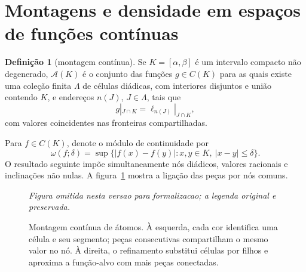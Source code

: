 \documentclass[11pt,a4paper]{article}
\theoremstyle{preciso}
\theoremstyle{definition}
\newtheorem{definicao}[teorema]{Definição}
\newcommand{\Asm}{\mathcal A}
\newcommand{\eqn}[2]{\begin{equation}\label{eq:#1}#2\end{equation}}
\newcommand{\figura}[4]{\begin{figure}[!htbp]\centering
 \emph{Figura omitida nesta versao para formalizacao; a legenda original e preservada.}
 \caption{#3}\label{fig:#4}\end{figure}}
\begin{document}


\section{Montagens e densidade em espaços de funções contínuas}
\begin{definicao}[montagem contínua]
Se $K=[\alpha,\beta]$ é um intervalo compacto não degenerado, $\Asm(K)$ é o conjunto das funções $g\in C(K)$ para as quais existe uma coleção finita $\Lambda$ de células diádicas, com interiores disjuntos e união contendo $K$, e endereços $n(J)$, $J\in\Lambda$, tais que
\eqn{20}{g|_{J\cap K}=\ell_{n(J)}|_{J\cap K},}
com valores coincidentes nas fronteiras compartilhadas.
\end{definicao}
Para $f\in C(K)$, denote o módulo de continuidade por
\eqn{21}{\omega(f;\delta)=\sup\{|f(x)-f(y)|:x,y\in K,\ |x-y|\le\delta\}.}
O resultado seguinte impõe simultaneamente nós diádicos, valores racionais e inclinações não nulas. A figura~\ref{fig:montagem} mostra a ligação das peças por nós comuns.
\figura{03_montagem_continua}{1}{Montagem contínua de átomos. À esquerda, cada cor identifica uma célula e seu segmento; peças consecutivas compartilham o mesmo valor no nó. À direita, o refinamento substitui células por filhos e aproxima a função-alvo com mais peças conectadas.}{montagem}
\end{document}
